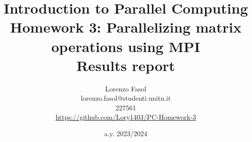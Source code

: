 \documentclass{article}
\begin{document}
    \title{
        Introduction to Parallel Computing\\
        Homework 3: Parallelizing matrix operations using MPI\\
        \textbf{Results report}
    }
    \author{
        Lorenzo Fasol\\
        lorenzo.fasol@studenti.unitn.it\\
        227561\\
        \url{https://github.com/Lory1403/PC-Homework-3}    
    }
    \date{a.y. 2023/2024}
    
    \maketitle

    

    

    \clearpage
    

    \clearpage

    \nocite{*}
    \printbibliography
\end{document}
